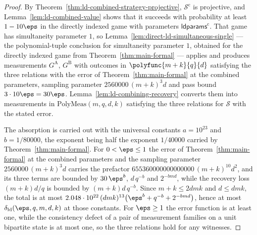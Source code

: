 \begin{proof}
	\leanok
	By Theorem~\ref{thm:ld-combined-strategy-projective},
	$\mathcal S^{\mathrm c}$ is projective, and
	Lemma~\ref{lem:ld-combined-value} shows that it succeeds with probability at
	least $1 - 10\eps$ in the directly indexed game with parameters
	$\mathsf{ldparams}^{\mathrm c}$.  That game has simultaneity parameter $1$, so
	Lemma~\ref{lem:direct-ld-simultaneous-single} --- the polynomial-tuple
	conclusion for simultaneity parameter $1$, obtained for the directly indexed
	game from Theorem~\ref{thm:main-formal} --- applies and produces measurements
	$G^{\mathrm A}$, $G^{\mathrm B}$ with outcomes in $\polyfunc{m+k}{q}{d}$
	satisfying the three relations with the error of
	Theorem~\ref{thm:main-formal} at the combined parameters, sampling parameter
	$2560000\,(m+k)^{3}d$ and pass bound $3 \cdot 10\eps = 30\eps$.
	Lemma~\ref{lem:ld-combining-recovery} converts them into measurements in
	$\mathrm{PolyMeas}(m,q,d,k)$ satisfying the three relations for
	$\mathcal S$ with the stated error.

	The absorption is carried out with the universal constants $a = 10^{23}$ and
	$b = 1/80000$, the exponent being half the exponent $1/40000$ carried by
	Theorem~\ref{thm:main-formal}.  For $0 < \eps \le 1$ the error of
	Theorem~\ref{thm:main-formal} at the combined parameters and the sampling
	parameter $2560000\,(m+k)^{3}d$ carries the prefactor
	$655360000000000000\,(m+k)^{10}d^{2}$, and its three terms are bounded by
	$30\,\eps^{b}$, $d\,q^{-b}$ and $2^{-bmd}$, while the recovery loss
	$(m+k)d/q$ is bounded by $(m+k)d\,q^{-b}$.  Since $m + k \le 2dmk$ and
	$d \le dmk$, the total is at most
	$2.048 \cdot 10^{22}\,(dmk)^{13}\bigl(\eps^{b} + q^{-b} + 2^{-bmd}\bigr)$,
	hence at most $\delta_{\mathrm{ld}}(\eps,q,m,d,k)$ at those constants.  For
	$\eps \ge 1$ the error function is at least one, while the consistency defect
	of a pair of measurement families on a unit bipartite state is at most one, so
	the three relations hold for any witnesses.
\end{proof}

